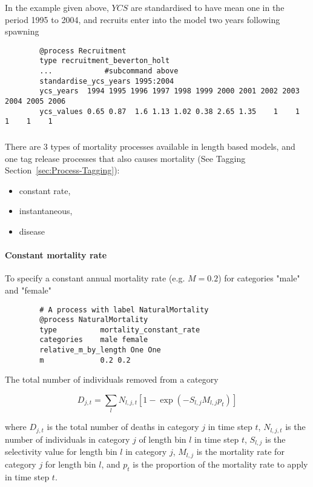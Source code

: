 In the  example given above,  $YCS$ are standardised to have mean one in the period 1995 to 2004, and recruits enter into the model two years following spawning

{\small{\begin{verbatim}
		@process Recruitment
		type recruitment_beverton_holt
		...            #subcommand above
		standardise_ycs_years 1995:2004
		ycs_years  1994 1995 1996 1997 1998 1999 2000 2001 2002 2003 2004 2005 2006
		ycs_values 0.65 0.87  1.6 1.13 1.02 0.38 2.65 1.35    1    1    1    1    1
		\end{verbatim}}}


\subsubsection{\label{sec:Process-Mortality}}

There are 3 types of mortality processes available in \CNAME length based models, and one tag release processes that also causes mortality (See Tagging Section~\ref{sec:Process-Tagging}):

\begin{itemize}
	\item constant rate,
	\item instantaneous,
	\item disease
\end{itemize}

\paragraph{Constant mortality rate}\label{sec:Process-Length-MortalityConstantRate} 

To specify a constant annual mortality rate (e.g. $M=0.2$) for categories "male" and "female"
{\small{\begin{verbatim}
		# A process with label NaturalMortality
		@process NaturalMortality
		type          mortality_constant_rate
		categories    male female
		relative_m_by_length One One
		m             0.2 0.2
		\end{verbatim}}}

The total number of individuals removed from a category

\begin{equation}
D_{j,t} = \sum_l N_{l,j,t} [1 - \exp(-S_{l,j} M_{l,j} p_t)]
\end{equation}

where $D_{j,t}$ is the total number of deaths in category $j$ in time step $t$, $N_{l,j,t}$ is the number of individuals in category $j$ of length bin $l$ in time step $t$, $S_{l,j}$ is the selectivity value for length bin $l$ in category $j$, $M_{l,j}$ is the mortality rate for category $j$ for length bin $l$, and $p_t$ is the proportion of the mortality rate to apply in time step $t$.

